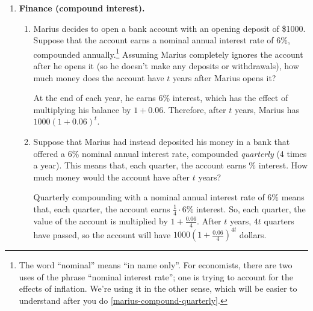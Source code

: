 \documentclass{article}
\begin{document}
\begin{enumerate}
\begin{enumerate}
  \end{enumerate}

\item  \label{compound-interest} \textbf{Finance (compound interest).} 
  \begin{enumerate}

  \item \label{marius-compound-annually}

    \begin{problem}[\nstretch{0.75}]
      Marius decides to open a bank account with an opening deposit of \$1000. Suppose that the account earns a nominal annual interest rate of 6\%, compounded annually.\footnote{The word ``nominal'' means ``in name only''. For economists, there are two uses of the phrase ``nominal interest rate''; one is trying to account for the effects of inflation. We're using it in the other sense, which will be easier to understand after you do \ref{marius-compound-quarterly}.} Assuming Marius completely ignores the account after he opens it (so he doesn't make any deposits or withdrawals), how much money does the account have $t$ years after Marius opens it? 
    \end{problem}

    \begin{solution}
      At the end of each year, he earns 6\% interest, which has the effect of multiplying his balance by $1 + 0.06$. Therefore, after $t$ years, Marius has $1000 (1 + 0.06)^t$. 
    \end{solution}

  \item \label{marius-compound-quarterly}


    \begin{problem}[\vfill]
      Suppose that Marius had instead deposited his money in a bank that
      offered a 6\% nominal annual interest rate, compounded
      \emph{quarterly} (4 times a year).  This means that, each quarter, 
      the account earns \% interest.  How much money would
      the account have after $t$ years?
    \end{problem}

    \begin{solution}
      Quarterly compounding with a nominal annual interest rate of 6\% means that, each quarter, the account earns $\frac{1}{4} \cdot 6$\% interest. So, each quarter, the value of the account is multiplied by $1 + \frac{0.06}{4}$. After $t$ years, $4t$ quarters have passed, so the account will have $\boxed{1000 \left( 1 + \frac{0.06}{4} \right)^{4t}}$ dollars.


\end{solution}
\end{enumerate}
\end{enumerate}
\end{document}
